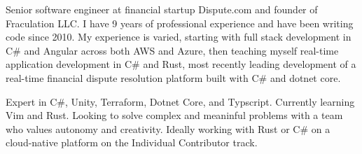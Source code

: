 

\begin{cvparagraph}

Senior software engineer at financial startup Dispute.com and founder of Fraculation LLC.\@
I have 9 years of professional experience and have been writing code since 2010. My experience is varied, starting with 
full stack development in C\# and Angular across both AWS and Azure, then teaching myself real-time application development in C\# and Rust,
most recently leading development of a real-time financial dispute resolution platform built with C\# and dotnet core.

Expert in C\#, Unity, Terraform, Dotnet Core, and Typscript. Currently learning Vim and Rust. 
Looking to solve complex and meaninful problems with a team who values autonomy and creativity.
Ideally working with Rust or C\# on a cloud-native platform on the Individual Contributor track.

\end{cvparagraph}
